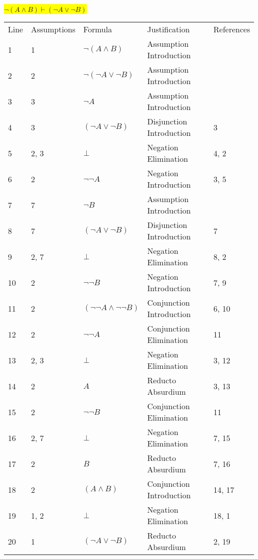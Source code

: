 \documentclass[12pt]{article}
\newcommand{\pr}[1]{\bigbreak \colorbox{Yellow}{$#1$} \smallbreak}
\begin{document}
\begin{flushleft}
\pr{\neg (A\land B) \vdash (\neg A\lor \neg B)}
\begin{tabular}{lllll}
    Line & Assumptions & Formula & Justification & References \\
    1 & 1 & $\neg (A\land B)$  & Assumption Introduction &  \\
    2 & 2 & $\neg (\neg A\lor \neg B)$  & Assumption Introduction &  \\
    3 & 3 & $\neg A$  & Assumption Introduction &  \\
    4 & 3 & $(\neg A\lor \neg B)$  & Disjunction Introduction & 3 \\
    5 & 2, 3 & $\bot $  & Negation Elimination & 4, 2 \\
    6 & 2 & $\neg \neg A$  & Negation Introduction & 3, 5 \\
    7 & 7 & $\neg B$  & Assumption Introduction &  \\
    8 & 7 & $(\neg A\lor \neg B)$  & Disjunction Introduction & 7 \\
    9 & 2, 7 & $\bot $  & Negation Elimination & 8, 2 \\
    10 & 2 & $\neg \neg B$  & Negation Introduction & 7, 9 \\
    11 & 2 & $(\neg \neg A\land \neg \neg B)$  & Conjunction Introduction & 6, 10 \\
    12 & 2 & $\neg \neg A$  & Conjunction Elimination & 11 \\
    13 & 2, 3 & $\bot $  & Negation Elimination & 3, 12 \\
    14 & 2 & $A$  & Reducto Absurdium & 3, 13 \\
    15 & 2 & $\neg \neg B$  & Conjunction Elimination & 11 \\
    16 & 2, 7 & $\bot $  & Negation Elimination & 7, 15 \\
    17 & 2 & $B$  & Reducto Absurdium & 7, 16 \\
    18 & 2 & $(A\land B)$  & Conjunction Introduction & 14, 17 \\
    19 & 1, 2 & $\bot $  & Negation Elimination & 18, 1 \\
    20 & 1 & $(\neg A\lor \neg B)$  & Reducto Absurdium & 2, 19 \\
\end{tabular}


\end{flushleft}
\end{document}
